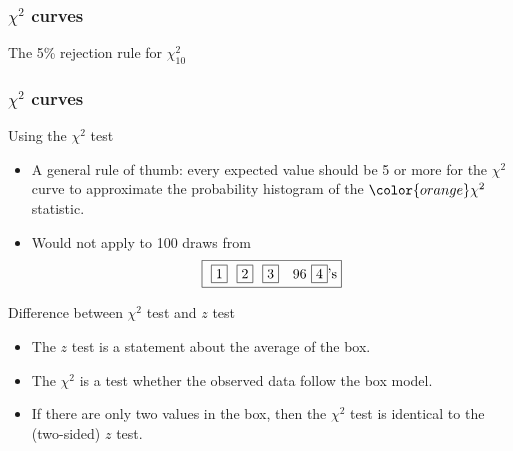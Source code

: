 \documentclass[handout]{beamer}
\begin{document}
   \begin{frame}
   \frametitle{$\chi^2$ curves}
   \begin{center}
   \end{center}
   The 5\% rejection rule for $\chi^2_{10}$
   \end{frame}


   \begin{frame} \frametitle{$\chi^2$ curves}

   \begin{block}
   {Using the $\chi^2$ test}

   \begin{itemize}
   \item A general rule of thumb: every expected value should be 5 or more
   for the $\chi^2$ curve to approximate the probability
   histogram of the ${\color{orange} \chi^2}$ statistic.

   \item Would not apply to 100 draws from
     $$
       \fbox{ \fbox{1} \ \fbox{2} \  \fbox{3} \ \ 96 \fbox{4}'s}
     $$


   \end{itemize}
   \end{block}

   \begin{block}
     {Difference between $\chi^2$ test and $z$ test}
     \begin{itemize}
     \item The $z$ test is a statement about the average of the box.
     \item The $\chi^2$ is a test whether the  observed data follow the
     box model.
     \item If there are only two values in the box, then the
     $\chi^2$ test is identical to the (two-sided) $z$ test.
     \end{itemize}
   \end{block}
   \end{frame}

\end{document}
